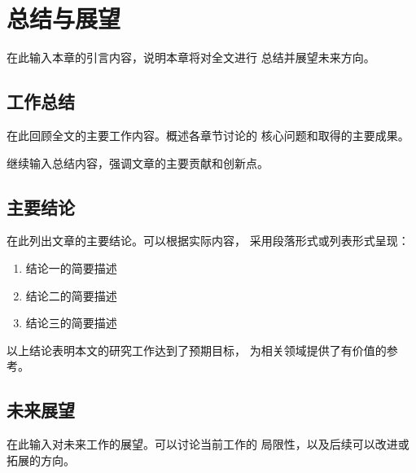 
\section{总结与展望}

在此输入本章的引言内容，说明本章将对全文进行
总结并展望未来方向。

\subsection{工作总结}

在此回顾全文的主要工作内容。概述各章节讨论的
核心问题和取得的主要成果。

继续输入总结内容，强调文章的主要贡献和创新点。

\subsection{主要结论}

在此列出文章的主要结论。可以根据实际内容，
采用段落形式或列表形式呈现：

\begin{enumerate}[label={(\arabic*)}]
    \item 结论一的简要描述
    \item 结论二的简要描述
    \item 结论三的简要描述
\end{enumerate}

以上结论表明本文的研究工作达到了预期目标，
为相关领域提供了有价值的参考。

\subsection{未来展望}

在此输入对未来工作的展望。可以讨论当前工作的
局限性，以及后续可以改进或拓展的方向。
